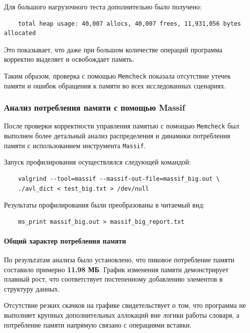 \documentclass[12pt]{article}
\begin{document}
Для большого нагрузочного теста дополнительно было получено:
\begin{verbatim}
	total heap usage: 40,007 allocs, 40,007 frees, 11,931,056 bytes allocated
\end{verbatim}

Это показывает, что даже при большом количестве операций программа корректно выделяет и освобождает память.

Таким образом, проверка с помощью \texttt{Memcheck} показала отсутствие утечек памяти и ошибок обращения к памяти во всех исследованных сценариях.

\vspace{1\baselineskip}

\subsubsection*{Анализ потребления памяти с помощью Massif}

После проверки корректности управления памятью с помощью \texttt{Memcheck} был выполнен более детальный анализ распределения и динамики потребления памяти с использованием инструмента \texttt{Massif}.

Запуск профилирования осуществлялся следующей командой:

\begin{verbatim}
	valgrind --tool=massif --massif-out-file=massif_big.out \
	./avl_dict < test_big.txt > /dev/null
\end{verbatim}

Результаты профилирования были преобразованы в читаемый вид:

\begin{verbatim}
	ms_print massif_big.out > massif_big_report.txt
\end{verbatim}

\paragraph{Общий характер потребления памяти}

По результатам анализа было установлено, что пиковое потребление памяти составило примерно \textbf{11.98 МБ}. График изменения памяти демонстрирует плавный рост, что соответствует постепенному добавлению элементов в структуру данных.

Отсутствие резких скачков на графике свидетельствует о том, что программа не выполняет крупных дополнительных аллокаций вне логики работы словаря, а потребление памяти напрямую связано с операциями вставки.
\end{document}
